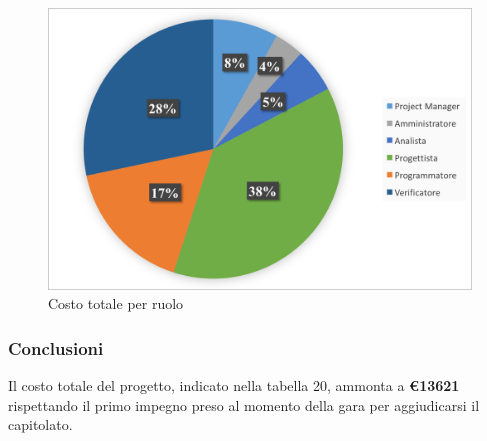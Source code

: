 \begin{figure}[H]
	\centering 
	\includegraphics[scale=0.7]{Immagini/GraficiTorteSezione6/TOT.png}
	\caption{Costo totale per ruolo}
\end{figure}

\subsubsection{Conclusioni}
Il costo totale del progetto, indicato nella tabella 20, ammonta a \textbf{\euro 13621} rispettando il primo impegno preso al momento della gara per aggiudicarsi il capitolato.\\